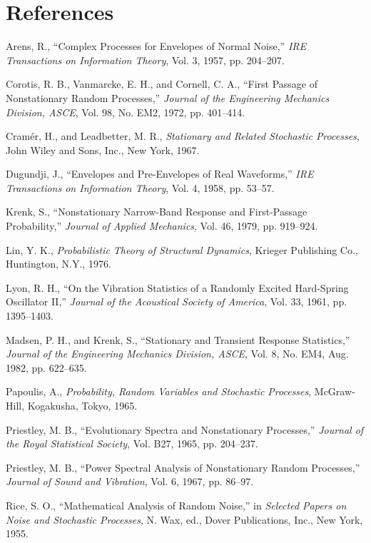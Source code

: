 \documentclass[12pt]{article}
\begin{document}
\section*{References}
\begin{thebibliography}{99}
Arens, R., ``Complex Processes for Envelopes of Normal Noise,'' \emph{IRE Transactions on Information Theory}, Vol. 3, 1957, pp. 204--207.

Corotis, R. B., Vanmarcke, E. H., and Cornell, C. A., ``First Passage of Nonstationary Random Processes,'' \emph{Journal of the Engineering Mechanics Division, ASCE}, Vol. 98, No. EM2, 1972, pp. 401--414.

Cramér, H., and Leadbetter, M. R., \emph{Stationary and Related Stochastic Processes}, John Wiley and Sons, Inc., New York, 1967.

Dugundji, J., ``Envelopes and Pre-Envelopes of Real Waveforms,'' \emph{IRE Transactions on Information Theory}, Vol. 4, 1958, pp. 53--57.

Krenk, S., ``Nonstationary Narrow-Band Response and First-Passage Probability,'' \emph{Journal of Applied Mechanics}, Vol. 46, 1979, pp. 919--924.

Lin, Y. K., \emph{Probabilistic Theory of Structural Dynamics}, Krieger Publishing Co., Huntington, N.Y., 1976.

Lyon, R. H., ``On the Vibration Statistics of a Randomly Excited Hard-Spring Oscillator II,'' \emph{Journal of the Acoustical Society of America}, Vol. 33, 1961, pp. 1395--1403.

Madsen, P. H., and Krenk, S., ``Stationary and Transient Response Statistics,'' \emph{Journal of the Engineering Mechanics Division, ASCE}, Vol. 8, No. EM4, Aug. 1982, pp. 622--635.

Papoulis, A., \emph{Probability, Random Variables and Stochastic Processes}, McGraw-Hill, Kogakusha, Tokyo, 1965.

Priestley, M. B., ``Evolutionary Spectra and Nonstationary Processes,'' \emph{Journal of the Royal Statistical Society}, Vol. B27, 1965, pp. 204--237.

Priestley, M. B., ``Power Spectral Analysis of Nonstationary Random Processes,'' \emph{Journal of Sound and Vibration}, Vol. 6, 1967, pp. 86--97.

Rice, S. O., ``Mathematical Analysis of Random Noise,'' in \emph{Selected Papers on Noise and Stochastic Processes}, N. Wax, ed., Dover Publications, Inc., New York, 1955.


\end{thebibliography}
\end{document}
